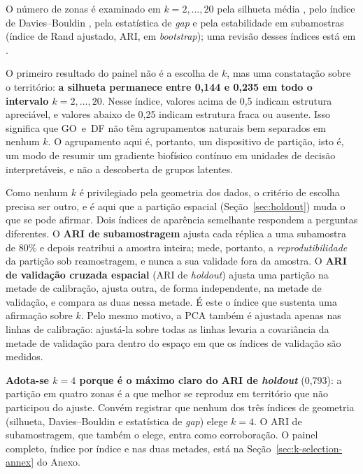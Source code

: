 O número de zonas é examinado em $k = 2,\dots,20$ pela silhueta média
\citep[p.~59]{rousseeuw_silhouettes_1987}, pelo índice de Davies--Bouldin \citep{davies_cluster_1979},
pela estatística de \emph{gap} \citep[p.~415]{tibshirani_estimating_2001}
e pela estabilidade em subamostras (índice de Rand ajustado, ARI, em \emph{bootstrap}); uma revisão
desses índices está em \citet{ikotun_cluster_2025}.

O primeiro resultado do painel não é a escolha de $k$, mas uma constatação sobre o território:
\textbf{a silhueta permanece entre 0,144 e 0,235 em todo o intervalo $k = 2,\dots,20$}. Nesse
índice, valores acima de 0,5 indicam estrutura apreciável, e valores abaixo de 0,25 indicam
estrutura fraca ou ausente. Isso significa que GO~e~DF não têm agrupamentos naturais
bem separados em nenhum $k$. O agrupamento aqui é, portanto, um dispositivo de
partição, isto é, um modo de resumir um gradiente biofísico contínuo em unidades de decisão
interpretáveis, e não a descoberta de grupos latentes.

Como nenhum $k$ é privilegiado pela geometria dos dados, o critério de escolha precisa ser outro, e
é aqui que a partição espacial (Seção~\ref{sec:holdout}) muda o que se pode afirmar. Dois índices de
aparência semelhante respondem a perguntas diferentes. O \textbf{ARI de subamostragem} ajusta cada
réplica a uma subamostra de 80\% e depois reatribui a amostra inteira; mede, portanto, a
\emph{reprodutibilidade} da partição sob reamostragem, e nunca a sua validade fora da amostra. O
\textbf{ARI de validação cruzada espacial} (ARI de \emph{holdout}) ajusta uma partição na metade de
calibração, ajusta outra, de forma independente, na metade de validação, e compara as duas nessa
metade. É este o índice que sustenta uma afirmação sobre $k$. Pelo mesmo motivo, a PCA também é
ajustada apenas nas linhas de calibração: ajustá-la sobre todas as linhas levaria a covariância da
metade de validação para dentro do espaço em que os índices de validação são medidos.

\textbf{Adota-se $k = 4$ porque é o máximo claro do ARI de \emph{holdout}} (0,793): a partição em
quatro zonas é a que melhor se reproduz em território que não participou do ajuste. Convém
registrar que nenhum dos três índices de geometria (silhueta, Davies--Bouldin e estatística de
\emph{gap}) elege $k=4$. O ARI de subamostragem, que também o elege, entra como corroboração. O painel completo, índice por índice e nas duas metades, está na
Seção~\ref{sec:k-selection-annex} do Anexo.

